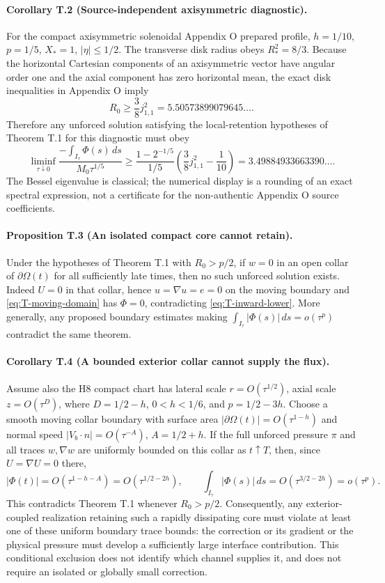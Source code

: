 \paragraph{Corollary T.2 (Source-independent axisymmetric diagnostic).}
For the compact axisymmetric solenoidal Appendix O prepared
profile, $h=1/10$, $p=1/5$, $X_*=1$, $|\eta|\le1/2$.
The transverse disk radius obeys $R_*^2=8/3$.
Because the horizontal Cartesian components of an axisymmetric
vector have angular order one and the axial component has zero
horizontal mean, the exact disk inequalities in Appendix O imply
\[
 R_0\ge\frac{3}{8}j_{1,1}^2
 =5.50573899079645\ldots .
\]
Therefore any unforced solution satisfying the local-retention
hypotheses of Theorem T.1 for this diagnostic must obey
\begin{equation}\label{eq:T-diagnostic-influx}
 \liminf_{\tau\downarrow0}
 \frac{-\int_{I_\tau}\Phi(s)\,ds}{M_0\tau^{1/5}}
 \ge \frac{1-2^{-1/5}}{1/5}
 \left(\frac38j_{1,1}^2-\frac1{10}\right)
 =3.49884933663390\ldots .
\end{equation}
The Bessel eigenvalue is classical; the numerical display is
a rounding of an exact spectral expression, not a certificate
for the non-authentic Appendix O source coefficients.

\paragraph{Proposition T.3 (An isolated compact core cannot retain).}
Under the hypotheses of Theorem T.1 with $R_0>p/2$,
if $w=0$ in an open collar of $\partial\Omega(t)$ for all
sufficiently late times, then no such unforced solution exists.
Indeed $U=0$ in that collar, hence $u=\nabla u=e=0$
on the moving boundary and \eqref{eq:T-moving-domain} has
$\Phi=0$, contradicting \eqref{eq:T-inward-lower}.
More generally, any proposed boundary estimates making
$\int_{I_\tau}|\Phi(s)|\,ds=o(\tau^p)$ contradict the same theorem.

\paragraph{Corollary T.4 (A bounded exterior collar cannot supply the flux).}
Assume also the H8 compact chart has lateral scale
$r=O(\tau^{1/2})$, axial scale $z=O(\tau^D)$,
where $D=1/2-h$, $0<h<1/6$, and $p=1/2-3h$.
Choose a smooth moving collar boundary with surface area
$|\partial\Omega(t)|=O(\tau^{1-h})$ and normal speed
$|V_b\cdot n|=O(\tau^{-A})$, $A=1/2+h$.
If the full unforced pressure $\pi$ and all traces
$w,\nabla w$ are uniformly bounded on this collar
as $t\uparrow T$, then, since $U=\nabla U=0$ there,
\[
 |\Phi(t)|=O(\tau^{1-h-A})
          =O(\tau^{1/2-2h}),\qquad
 \int_{I_\tau}|\Phi(s)|\,ds
          =O(\tau^{3/2-2h})
          =o(\tau^{p}).
\]
This contradicts Theorem T.1 whenever $R_0>p/2$.
Consequently, any exterior-coupled realization retaining such
a rapidly dissipating core must violate at least one of these
uniform boundary trace bounds: the correction or its gradient
or the physical pressure must develop a sufficiently large
interface contribution. This conditional exclusion does not
identify which channel supplies it, and does not require an
isolated or globally small correction.

